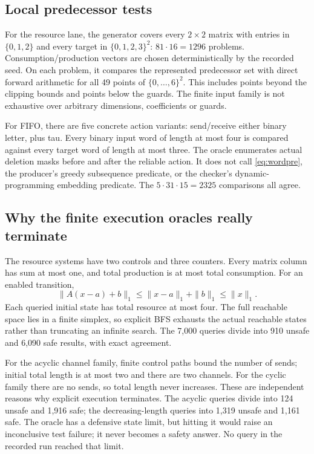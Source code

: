 \documentclass[11pt,a4paper]{article}
\theoremstyle{definition}
\begin{document}
\subsection{Local predecessor tests}
For the resource lane, the generator covers every $2\times2$ matrix with
entries in $\{0,1,2\}$ and every target in $\{0,1,2,3\}^2$: $81\cdot16=1296$
problems. Consumption/production vectors are chosen deterministically by the
recorded seed. On each problem, it compares the represented predecessor set
with direct forward arithmetic for all 49 points of $\{0,\ldots,6\}^2$.
This includes points beyond the clipping bounds and points below the guards.
The finite input family is not exhaustive over arbitrary dimensions,
coefficients or guards.

For FIFO, there are five concrete action variants: send/receive either binary
letter, plus tau. Every binary input word of length at most four is compared
against every target word of length at most three. The oracle enumerates
actual deletion masks before and after the reliable action. It does not call
\eqref{eq:wordpre}, the producer's greedy subsequence predicate, or the
checker's dynamic-programming embedding predicate. The $5\cdot31\cdot15=2325$
comparisons all agree.

\subsection{Why the finite execution oracles really terminate}
The resource systems have two controls and three counters. Every matrix
column has sum at most one, and total production is at most total consumption.
For an enabled transition,
\[
 \|A(x-a)+b\|_1\leq\|x-a\|_1+\|b\|_1\leq\|x\|_1.
\]
Each queried initial state has total resource at most four. The full reachable
space lies in a finite simplex, so explicit BFS exhausts the actual reachable
states rather than truncating an infinite search. The 7,000 queries divide
into 910 unsafe and 6,090 safe results, with exact agreement.

For the acyclic channel family, finite control paths bound the number of
sends; initial total length is at most two and there are two channels. For
the cyclic family there are no sends, so total length never increases. These
are independent reasons why explicit execution terminates. The acyclic
queries divide into 124 unsafe and 1,916 safe; the decreasing-length queries
into 1,319 unsafe and 1,161 safe. The oracle has a defensive state limit, but
hitting it would raise an inconclusive test failure; it never becomes a safety
answer. No query in the recorded run reached that limit.
\end{document}
